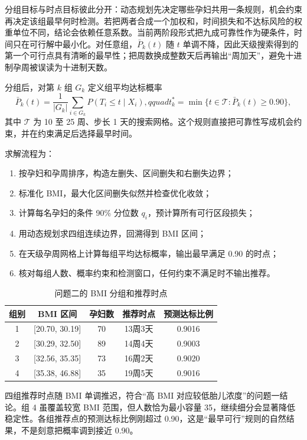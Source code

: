 \documentclass[UTF8,a4paper,12pt]{ctexart}
\begin{document}
分组目标与时点目标彼此分开：动态规划先决定哪些孕妇共用一条规则，机会约束再决定该组最早何时检测。若把两者合成一个加权和，时间损失和不达标风险的权重单位不同，结论会依赖任意系数。当前两阶段形式把九成可靠性作为硬条件，时间只在可行解中最小化。对任意组，$\bar P_k(t)$ 随 $t$ 单调不降，因此天级搜索得到的第一个可行点具有清晰的最早性；把周数换成整数天后再输出“周加天”，避免十进制孕周被误读为十进制天数。

分组后，对第 $k$ 组 $G_k$ 定义组平均达标概率
\begin{equation}
\bar P_k(t)=\frac{1}{|G_k|}\sum_{i\in G_k}P(T_i\le t\mid X_i),qquad
t_k^*=\min\{t\in\mathcal T:\bar P_k(t)\ge0.90\},
\label{eq:recommend}
\end{equation}
其中 $\mathcal T$ 为 10 至 25 周、步长 1 天的搜索网格。这个规则直接把可靠性写成机会约束，并在约束满足后选择最早时间。

求解流程为：
\begin{enumerate}
  \item 按孕妇和孕周排序，构造左删失、区间删失和右删失边界；
  \item 标准化 BMI，最大化区间删失似然并检查优化收敛；
  \item 计算每名孕妇的条件 90\% 分位数 $q_i$，预计算所有可行区段损失；
  \item 用动态规划求四组连续边界，回溯得到 BMI 区间；
  \item 在天级孕周网格上计算每组平均达标概率，输出最早满足 0.90 的时点；
  \item 核对每组人数、概率约束和检测窗口，任何约束不满足时不输出推荐。
\end{enumerate}

\begin{table}[H]
\centering
\caption{问题二的 BMI 分组和推荐时点}
\small
\begin{tabular}{ccccc}
\toprule
组别 & BMI 区间 & 孕妇数 & 推荐时点 & 预测达标比例 \\
\midrule
1 & [20.70, 30.19] & 70 & 13周3天 & 0.9016 \\
2 & [30.29, 32.50] & 89 & 14周4天 & 0.9003 \\
3 & [32.56, 35.35] & 73 & 16周2天 & 0.9020 \\
4 & [35.38, 46.88] & 35 & 19周5天 & 0.9016 \\
\bottomrule
\end{tabular}
\end{table}

四组推荐时点随 BMI 单调推迟，符合“高 BMI 对应较低胎儿浓度”的问题一结论。组 4 虽覆盖较宽 BMI 范围，但人数恰为最小容量 35，继续细分会显著降低稳定性。各组推荐点的预测达标比例刚超过 0.90，这是“最早可行”规则的自然结果，不是刻意把概率调到接近 0.90。
\end{document}
